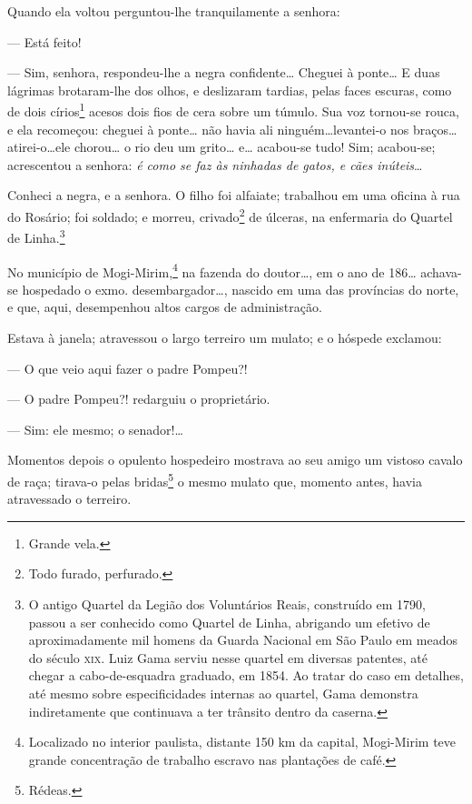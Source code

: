   Quando ela voltou perguntou-lhe tranquilamente a senhora:

  --- Está feito! %

--- Sim, senhora, respondeu-lhe a negra confidente\ldots{} Cheguei à
ponte\ldots{} E duas lágrimas brotaram-lhe dos olhos, e deslizaram tardias,
pelas faces escuras, como de dois círios\footnote{Grande vela.} acesos
dois fios de cera sobre um túmulo. Sua voz tornou-se rouca, e ela
recomeçou: cheguei à ponte\ldots{} não havia ali ninguém\ldots{}levantei-o nos
braços\ldots{}atirei-o\ldots{}ele chorou\ldots{} o rio deu um grito\ldots{} e\ldots{} acabou-se
tudo! Sim; acabou-se; acrescentou a senhora: \emph{é como se faz às
ninhadas de gatos, e cães inúteis}\ldots{}

Conheci a negra, e a senhora. O filho foi alfaiate; trabalhou em uma
oficina à rua do Rosário; foi soldado; e morreu, crivado\footnote{Todo
  furado, perfurado.} de úlceras, na enfermaria do Quartel de
Linha.\footnote{O antigo Quartel da Legião dos Voluntários Reais,
  construído em 1790, passou a ser conhecido como Quartel de Linha,
  abrigando um efetivo de aproximadamente mil homens da Guarda Nacional
  em São Paulo em meados do século \textsc{xix}. Luiz Gama serviu nesse quartel
  em diversas patentes, até chegar a cabo-de-esquadra graduado, em 1854.
  Ao tratar do caso em detalhes, até mesmo sobre especificidades
  internas ao quartel, Gama demonstra indiretamente que continuava a ter
  trânsito dentro da caserna.}

\asterisc

No município de Mogi-Mirim,\footnote{Localizado no interior paulista,
  distante 150 km da capital, Mogi-Mirim teve grande concentração de
  trabalho escravo nas plantações de café.} na fazenda do doutor\ldots{}, em
o ano de 186\ldots{} achava-se hospedado o exmo. desembargador\ldots{}, nascido em
uma das províncias do norte, e que, aqui, desempenhou altos cargos de
administração.

Estava à janela; atravessou o largo terreiro um mulato; e o hóspede
exclamou:

--- O que veio aqui fazer o padre Pompeu?!

--- O padre Pompeu?! redarguiu o proprietário.

--- Sim: ele mesmo; o senador!\ldots{}

Momentos depois o opulento hospedeiro mostrava ao seu amigo um vistoso
  cavalo de raça; tirava-o pelas bridas\footnote{Rédeas.} o mesmo
  mulato que, momento antes, havia atravessado o terreiro.

